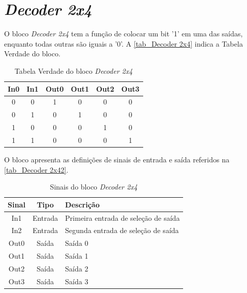 \renewcommand{\NomeBloco}{\emph{Decoder 2x4}}
\renewcommand{\NomeBlocoNoIt}{Decoder 2x4}
\renewcommand{\NomePTab}{tab_\NomeBlocoNoIt}
\renewcommand{\NomeSTab}{tab_\NomeBlocoNoIt2}
\renewcommand{\NomePFig}{fig_\NomeBlocoNoIt}
\renewcommand{\NomeSFig}{fig_\NomeBlocoNoIt2}
\renewcommand{\NomeTTab}{tab_\NomeBlocoNoIt3}

\section{\NomeBloco}

O bloco \NomeBloco{} tem a fun{\c c}\~ao de colocar um bit '1' em uma das sa\'idas, enquanto todas outras s\~ao iguais a '0'. A \autoref{\NomePTab} indica a Tabela Verdade do bloco.

\begin{table}[htbp]

\caption{Tabela Verdade do bloco \NomeBloco}%
\label{\NomePTab}
\centering
\begin{tabular}{cccccc}
    \toprule
    In0 & In1 & Out0 & Out1 & Out2 & Out3 \\
    \midrule \midrule
    0 & 0 & 1 & 0 & 0 & 0 \\
    \midrule
    0 & 1 & 0 & 1 & 0 & 0 \\
    \midrule
    1 & 0 & 0 & 0 & 1 & 0 \\
    \midrule
    1 & 1 & 0 & 0 & 0 & 1 \\
\bottomrule

\end{tabular}
\end{table}

O bloco apresenta as defini{\c c}\~oes de sinais de entrada e sa\'ida referidos na \autoref{\NomeSTab}.

\begin{table}[htbp]
\caption{Sinais do bloco \NomeBloco}
\label{\NomeSTab}
\centering
\begin{tabular}{ccl}

    \toprule
    Sinal & Tipo    & Descri{\c c}\~ao        \\
    \midrule \midrule
    In1    & Entrada & Primeira entrada de sele{\c c}\~ao de sa\'ida \\
    \midrule
    In2    & Entrada & Segunda entrada de sele{\c c}\~ao de sa\'ida \\
    \midrule
    Out0 & Sa\'ida & Sa\'ida 0\\
    \midrule
    Out1 & Sa\'ida & Sa\'ida 1\\
    \midrule
    Out2 & Sa\'ida & Sa\'ida 2\\
    \midrule
    Out3 & Sa\'ida & Sa\'ida 3\\
    \bottomrule
\end{tabular}
\end{table}

